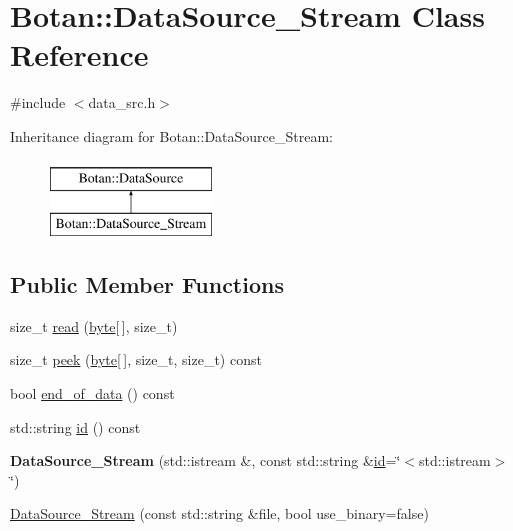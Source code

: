 \hypertarget{classBotan_1_1DataSource__Stream}{\section{Botan\-:\-:Data\-Source\-\_\-\-Stream Class Reference}
\label{classBotan_1_1DataSource__Stream}
}


{\ttfamily \#include $<$data\-\_\-src.\-h$>$}

Inheritance diagram for Botan\-:\-:Data\-Source\-\_\-\-Stream\-:\begin{figure}[H]
\begin{center}
\leavevmode
\includegraphics[height=2.000000cm]{classBotan_1_1DataSource__Stream}
\end{center}
\end{figure}
\subsection*{Public Member Functions}
\begin{DoxyCompactItemize}
\item 
size\-\_\-t \hyperlink{classBotan_1_1DataSource__Stream_a77a7baaf1c42a84f11969b2c8dcbc241}{read} (\hyperlink{namespaceBotan_a7d793989d801281df48c6b19616b8b84}{byte}\mbox{[}$\,$\mbox{]}, size\-\_\-t)
\item 
size\-\_\-t \hyperlink{classBotan_1_1DataSource__Stream_a204d94b6d97c3e7606ddd7710d293dd2}{peek} (\hyperlink{namespaceBotan_a7d793989d801281df48c6b19616b8b84}{byte}\mbox{[}$\,$\mbox{]}, size\-\_\-t, size\-\_\-t) const 
\item 
bool \hyperlink{classBotan_1_1DataSource__Stream_a3ed55d610b0ca585da2b419128cf343a}{end\-\_\-of\-\_\-data} () const 
\item 
std\-::string \hyperlink{classBotan_1_1DataSource__Stream_a0334301a87a9683e11e7291312e0935d}{id} () const 
\item 
\hypertarget{classBotan_1_1DataSource__Stream_a10c9cab5535e0a2bdc4907b3838b3536}{{\bfseries Data\-Source\-\_\-\-Stream} (std\-::istream \&, const std\-::string \&\hyperlink{classBotan_1_1DataSource__Stream_a0334301a87a9683e11e7291312e0935d}{id}=\char`\"{}$<$std\-::istream$>$\char`\"{})}\label{classBotan_1_1DataSource__Stream_a10c9cab5535e0a2bdc4907b3838b3536}

\item 
\hyperlink{classBotan_1_1DataSource__Stream_a4f049d96fb78c1c943378f9351c11d2e}{Data\-Source\-\_\-\-Stream} (const std\-::string \&file, bool use\-\_\-binary=false)
\end{DoxyCompactItemize}


